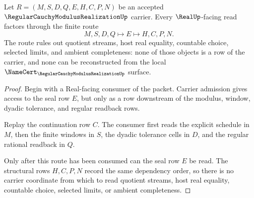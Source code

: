 \begin{theorem}
\label{thm:regular-cauchy-modulus-realization-real-seal-nonescape}
Let $R=(M,S,D,Q,E,H,C,P,N)$ be an accepted $\RegularCauchyModulusRealizationUp$ carrier. Every $\RealUp$-facing read factors through the finite route
$$
M,S,D,Q \longmapsto E \longmapsto H,C,P,N .
$$
The route rules out quotient streams, host real equality, countable choice, selected limits, and ambient completeness: none of those objects is a row of the carrier, and none can be reconstructed from the local $\NameCert_{\RegularCauchyModulusRealizationUp}$ surface.
\end{theorem}
\begin{proof}
Begin with a Real-facing consumer of the packet. Carrier admission gives access to the seal row $E$, but only as a row downstream of the modulus, window, dyadic tolerance, and regular readback rows.

Replay the continuation row $C$. The consumer first reads the explicit schedule in $M$, then the finite windows in $S$, the dyadic tolerance cells in $D$, and the regular rational readback in $Q$.

Only after this route has been consumed can the seal row $E$ be read. The structural rows $H,C,P,N$ record the same dependency order, so there is no carrier coordinate from which to read quotient streams, host real equality, countable choice, selected limits, or ambient completeness.
\end{proof}

